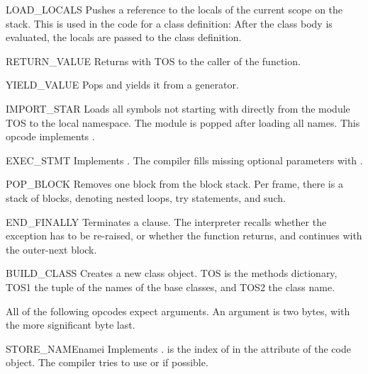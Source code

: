 \begin{opcodedesc}{LOAD_LOCALS}{}
Pushes a reference to the locals of the current scope on the stack.
This is used in the code for a class definition: After the class body
is evaluated, the locals are passed to the class definition.
\end{opcodedesc}

\begin{opcodedesc}{RETURN_VALUE}{}
Returns with TOS to the caller of the function.
\end{opcodedesc}

\begin{opcodedesc}{YIELD_VALUE}{}
Pops  and yields it from a generator.
\end{opcodedesc}

\begin{opcodedesc}{IMPORT_STAR}{}
Loads all symbols not starting with \character{_} directly from the module TOS
to the local namespace. The module is popped after loading all names.
This opcode implements .
\end{opcodedesc}

\begin{opcodedesc}{EXEC_STMT}{}
Implements .  The compiler fills
missing optional parameters with .
\end{opcodedesc}

\begin{opcodedesc}{POP_BLOCK}{}
Removes one block from the block stack.  Per frame, there is a 
stack of blocks, denoting nested loops, try statements, and such.
\end{opcodedesc}

\begin{opcodedesc}{END_FINALLY}{}
Terminates a  clause.  The interpreter recalls
whether the exception has to be re-raised, or whether the function
returns, and continues with the outer-next block.
\end{opcodedesc}

\begin{opcodedesc}{BUILD_CLASS}{}
Creates a new class object.  TOS is the methods dictionary, TOS1
the tuple of the names of the base classes, and TOS2 the class name.
\end{opcodedesc}

All of the following opcodes expect arguments.  An argument is two
bytes, with the more significant byte last.

\begin{opcodedesc}{STORE_NAME}{namei}
Implements .  is the index of 
in the attribute  of the code object.
The compiler tries to use  or 
if possible.
\end{opcodedesc}

